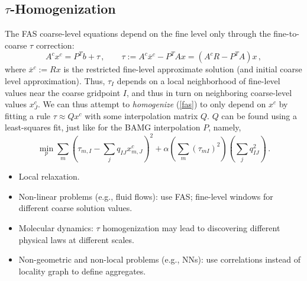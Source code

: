 \documentclass{article}
\begin{document}
\subsection{$\tau$-Homogenization}
\label{hom}
The FAS coarse-level equations depend on the fine level only through the fine-to-coarse $\tau$ correction:
\begin{equation}
	A^c x^c = P^T b + \tau\,,\qquad \tau :=  A^c \overline{x}^c - P^T A x = (A^c R - P^T A) x\,,
	\label{fas}
\end{equation}
where $\overline{x}^c := R x$ is the restricted fine-level approximate solution (and initial coarse level approximation). Thus, $\tau_I$ depends on a local neighborhood of fine-level values near the coarse gridpoint $I$, and thus in turn on neighboring coarse-level values $x^c_J$. We can thus attempt to \emph{homogenize} (\ref{fas}) to only depend on $x^c$  by fitting a rule $\tau \approx Q x^c$ with some interpolation matrix $Q$. $Q$ can be found using a least-squares fit, just like for the BAMG interpolation $P$, namely,
\begin{equation}
	\min_p \sum_m \left( \tau_{m,I} - \sum_j q_{IJ} x^c_{m,J} \right)^2 + \alpha \left( \sum_m (\tau_{mI})^2 \right) \left(\sum_j q_{IJ}^2\right) \,.
\end{equation}

\begin{itemize}
    \item Local relaxation.
	\item Non-linear problems (e.g., fluid flows): use FAS; fine-level windows for different coarse solution values.
	\item Molecular dynamics: $\tau$ homogenization may lead to discovering different physical laws at different scales.
	\item Non-geometric and non-local problems (e.g., NNs): use correlations instead of locality graph to define aggregates.
\end{itemize}



\end{document}
